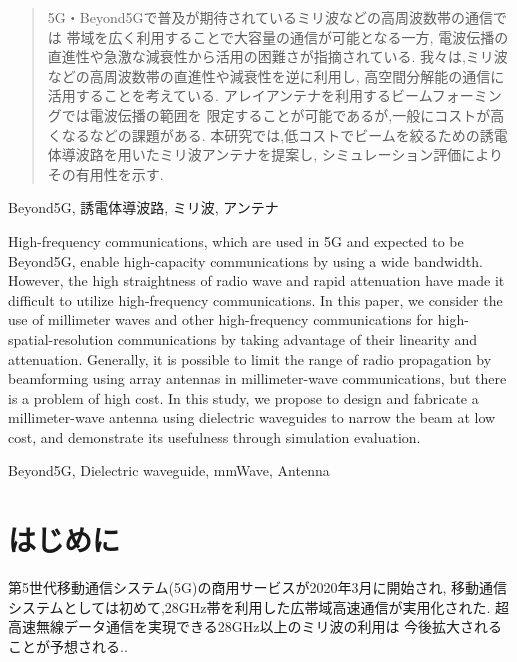\documentclass[technicalreport]{ieicej}
\begin{document}
\begin{abstract}
  5G・Beyond5Gで普及が期待されているミリ波などの高周波数帯の通信では
  帯域を広く利用することで大容量の通信が可能となる一方,
  電波伝播の直進性や急激な減衰性から活用の困難さが指摘されている.
  我々は,ミリ波などの高周波数帯の直進性や減衰性を逆に利用し,
  高空間分解能の通信に活用することを考えている.
  アレイアンテナを利用するビームフォーミングでは電波伝播の範囲を
  限定することが可能であるが,一般にコストが高くなるなどの課題がある.
  本研究では,低コストでビームを絞るための誘電体導波路を用いたミリ波アンテナを提案し,
  シミュレーション評価によりその有用性を示す.
\end{abstract}
\begin{keyword}
Beyond5G, 誘電体導波路, ミリ波, アンテナ
\end{keyword}
\begin{eabstract}
High-frequency communications,
which are used in 5G and expected to be Beyond5G,
enable high-capacity communications by using a wide bandwidth.
However, the high straightness of radio wave
and rapid attenuation
have made it difficult to utilize high-frequency communications.
In this paper, we consider the use of millimeter waves and
other high-frequency communications for high-spatial-resolution communications
by taking advantage of their linearity and attenuation.
Generally, it is possible to limit the range of radio propagation by
beamforming using array antennas in millimeter-wave communications,
but there is a problem of high cost.
In this study,
we propose to design and fabricate a millimeter-wave antenna using
dielectric waveguides to narrow the beam at low cost,
and demonstrate its usefulness through simulation evaluation.
\end{eabstract}
\begin{ekeyword}
Beyond5G, Dielectric waveguide, mmWave, Antenna
\end{ekeyword}
\maketitle

\section{はじめに}

第5世代移動通信システム(5G)の商用サービスが2020年3月に開始され,
移動通信システムとしては初めて,28GHz帯を利用した広帯域高速通信が実用化された.
超高速無線データ通信を実現できる28GHz以上のミリ波の利用は
今後拡大されることが予想される.\cite{docomo_6G_white_paper}.
\end{document}
